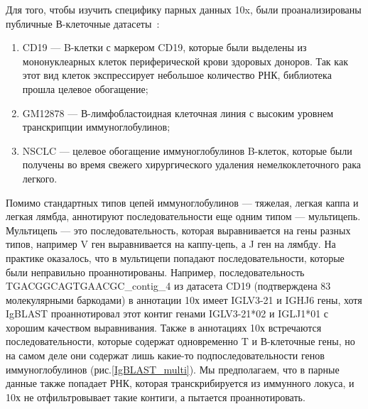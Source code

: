 \documentclass{spbau-diploma}
\begin{document}
Для того, чтобы изучить специфику парных данных 10x, были проанализированы публичные В-клеточные датасеты~\cite{10x_datasets}: 
\begin{enumerate}
    \item CD19 --- B-клетки с маркером CD19, которые были выделены из мононуклеарных клеток периферической крови здоровых доноров.
    Так как этот вид клеток экспрессирует небольшое количество РНК, библиотека прошла целевое обогащение;
    \item GM12878 --- В-лимфобластоидная клеточная линия с высоким уровнем транскрипции иммуноглобулинов;
    \item NSCLC --- целевое обогащение иммуноглобулинов B-клеток, которые были получены во время свежего хирургического удаления немелкоклеточного рака легкого.
\end{enumerate}

Помимо стандартных типов цепей иммуноглобулинов --- тяжелая, легкая каппа и легкая лямбда, аннотируют последовательности еще одним типом --- мультицепь.
Мультицепь --- это последовательность, которая выравнивается на гены разных типов, например V ген выравнивается на каппу-цепь, а J ген на лямбду.
На практике оказалось, что в мультицепи попадают последовательности, которые были неправильно проаннотированы.
Например, последовательность TGACGGCAGTGAACGC\_contig\_4 из датасета CD19 (подтверждена $83$ молекулярными баркодами) в аннотации 10х имеет IGLV3-21 и IGHJ6 гены, хотя IgBLAST проаннотировал этот контиг генами IGLV3-21*02 и IGLJ1*01 с хорошим качеством выравнивания.
Также в аннотациях 10х встречаются последовательности, которые содержат одновременно T и В-клеточные гены, но на самом деле они содержат лишь какие-то подпоследовательности генов иммуноглобулинов (рис.\ref{IgBLAST_multi}).
Мы предполагаем, что в парные данные также попадает РНК, которая транскрибируется из иммунного локуса, и 10х не отфильтровывает такие контиги, а пытается проаннотировать.
\end{document}
